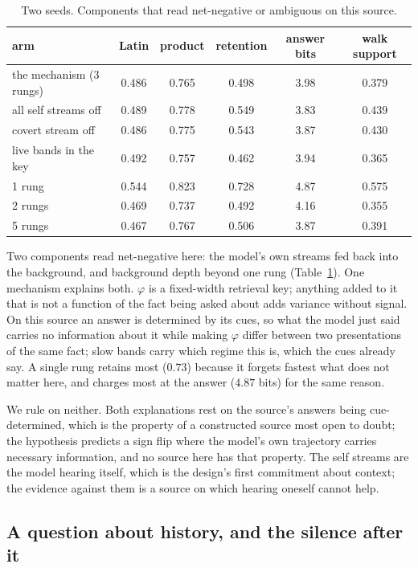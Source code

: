 \documentclass[11pt,a4paper]{article}
\theoremstyle{plain}
\theoremstyle{definition}
\theoremstyle{remark}
\begin{document}
\begin{table}[h]
\centering
\small
\begin{tabular}{lccccc}
\toprule
arm & Latin & product & retention & answer bits & walk support\\
\midrule
the mechanism (3 rungs) & 0.486 & 0.765 & 0.498 & 3.98 & 0.379\\
all self streams off & 0.489 & 0.778 & 0.549 & 3.83 & 0.439\\
covert stream off & 0.486 & 0.775 & 0.543 & 3.87 & 0.430\\
live bands in the key & 0.492 & 0.757 & 0.462 & 3.94 & 0.365\\
1 rung & 0.544 & 0.823 & 0.728 & 4.87 & 0.575\\
2 rungs & 0.469 & 0.737 & 0.492 & 4.16 & 0.355\\
5 rungs & 0.467 & 0.767 & 0.506 & 3.87 & 0.391\\
\bottomrule
\end{tabular}
\caption{Two seeds. Components that read net-negative or ambiguous on this
source.}
\label{tab:cannot}
\end{table}

Two components read net-negative here: the model's own streams fed back into the
background, and background depth beyond one rung (Table~\ref{tab:cannot}). One
mechanism explains both. $\varphi$ is a fixed-width retrieval key; anything
added to it that is not a function of the fact being asked about adds variance
without signal. On this source an answer is determined by its cues, so what the
model just said carries no information about it while making $\varphi$ differ
between two presentations of the same fact; slow bands carry which regime this
is, which the cues already say. A single rung retains most ($0.73$) because it
forgets fastest what does not matter here, and charges most at the answer
($4.87$ bits) for the same reason.

We rule on neither. Both explanations rest on the source's answers being
cue-determined, which is the property of a constructed source most open to
doubt; the hypothesis predicts a sign flip where the model's own trajectory
carries necessary information, and no source here has that property. The
self streams are the model hearing itself, which is the design's first
commitment about context; the evidence against them is a source on which
hearing oneself cannot help.

\subsection{A question about history, and the silence after it}
\label{sec:judge}
\end{document}
